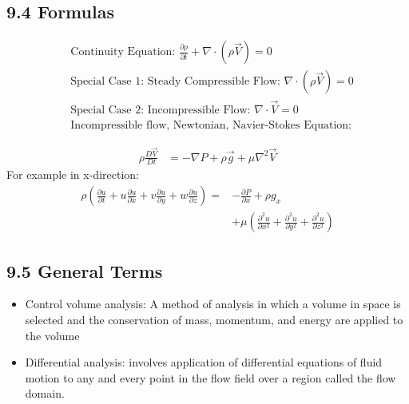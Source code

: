 \subsection*{9.4 Formulas}
\vspace{-0.4cm}
\begin{fleqn}
\begin{align*}
    &\text{Continuity Equation: } \frac{\partial \rho}{\partial t} + \nabla \cdot (\rho \vec{V}) = 0 \\
    &\text{Special Case 1: Steady Compressible Flow: } \nabla \cdot (\rho \vec{V}) = 0 \\
    &\text{Special Case 2: Incompressible Flow: } \nabla \cdot \vec{V} = 0 \\
    &\text{Incompressible flow, Newtonian, Navier-Stokes Equation:}
\end{align*}
\end{fleqn}
\vspace{-1.0cm}
\begin{align*}
    \rho \frac{ D \vec{V}}{D t}  &= -\nabla P + \rho \vec{g} + \mu \nabla^2 \vec{V} 
\end{align*}
For example in x-direction:
\begin{align*}
    \rho \left(\frac{\partial u}{\partial t} + u \frac{\partial u}{\partial x} + v \frac{\partial u}{\partial y} + w \frac{\partial u}{\partial z}\right) 
    = &-\frac{\partial P}{\partial x} + \rho g_x \\
    &+ \mu \left(\frac{\partial^2 u}{\partial x^2} + \frac{\partial^2 u}{\partial y^2} + \frac{\partial^2 u}{\partial z^2}\right)
\end{align*}
\vspace{-0.5cm}
\subsection*{9.5 General Terms}
\begin{itemize}
    \item Control volume analysis: A method of analysis in which a volume in space is selected and the conservation of mass, momentum, and energy are applied to the volume
    \item Differential analysis: involves application of differential equations of fluid motion to any and every point in the flow field over a region called the flow domain.
\end{itemize}